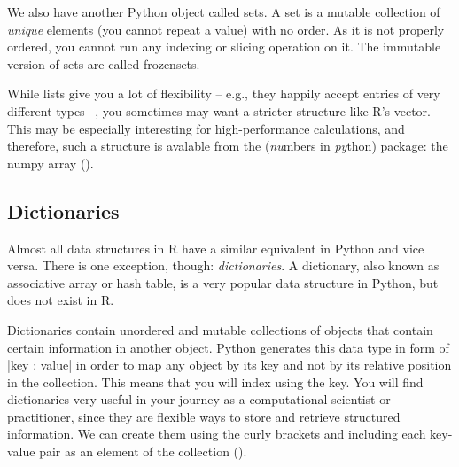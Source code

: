 



We also have another Python object called sets. A set is a mutable
collection of \emph{unique} elements (you cannot repeat a value) with
no order. As it is not properly ordered, you cannot run any indexing
or slicing operation on it. The immutable version of sets are called
frozensets.



While lists give you a lot of flexibility -- e.g., they happily accept
entries of very different types --, you sometimes may want a stricter
structure like R's vector. This may be especially interesting for
high-performance calculations, and therefore, such a structure is
avalable from the  (\emph{nu}mbers in \emph{py}thon)
package: the numpy array ().




\subsection{Dictionaries}
Almost all data structures in R have a similar equivalent in Python
and vice versa. There is one exception, though: \emph{dictionaries}. A
dictionary, also known as associative array or hash table, is a very
popular data structure in Python, but does not exist in R.

Dictionaries contain unordered and mutable collections of objects that
contain certain information in another object. Python generates this
data type in form of |{key : value}| in order
to map any object by its key and not by its relative position in the
collection. This means that you will index using the key. You will
find dictionaries very useful in your journey as a computational
scientist or practitioner, since they are flexible ways to store and
retrieve structured information. We can create them using the curly
brackets {} and including each key-value pair as an element of the
collection ().

